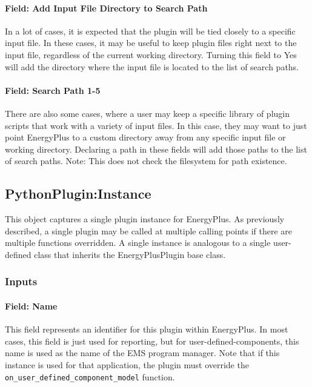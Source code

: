 \paragraph{Field: Add Input File Directory to Search Path}

In a lot of cases, it is expected that the plugin will be tied closely to a specific input file.
In these cases, it may be useful to keep plugin files right next to the input file, regardless of the current working directory.
Turning this field to Yes will add the directory where the input file is located to the list of search paths.

\paragraph{Field: Search Path 1-5}

There are also some cases, where a user may keep a specific library of plugin scripts that work with a variety of input files.
In this case, they may want to just point EnergyPlus to a custom directory away from any specific input file or working directory.
Declaring a path in these fields will add those paths to the list of search paths.
Note: This does not check the filesystem for path existence.

\subsection{PythonPlugin:Instance}

This object captures a single plugin instance for EnergyPlus.
As previously described, a single plugin may be called at multiple calling points if there are multiple functions overridden.
A single instance is analogous to a single user-defined class that inherits the EnergyPlusPlugin base class.

\subsubsection{Inputs}

\paragraph{Field: Name}

This field represents an identifier for this plugin within EnergyPlus.
In most cases, this field is just used for reporting, but for user-defined-components, this name is used as the name of the EMS program manager.
Note that if this instance is used for that application, the plugin must override the \verb=on_user_defined_component_model= function.

